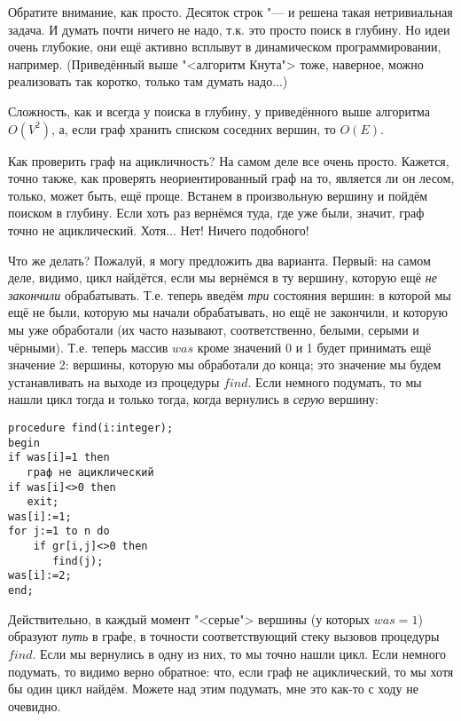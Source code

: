 Обратите внимание, как просто. Десяток строк "--- и решена такая нетривиальная задача. 
И думать почти ничего не надо, т.к. это просто поиск в глубину. Но идеи очень глубокие, они ещё 
активно всплывут в динамическом программировании, например. (Приведённый выше "<алгоритм Кнута">
тоже, наверное, можно реализовать так коротко, только там думать надо...)

Сложность, как и всегда у поиска в глубину, у приведённого выше алгоритма $O(V^2)$, а, если граф 
хранить списком соседних вершин, то $O(E)$.

Как проверить граф на ацикличность? На самом деле все очень просто. Кажется, точно также, как проверять 
неориентированный граф на то, является ли он лесом, только, может быть, ещё проще. Встанем в 
произвольную вершину и пойдём поиском в глубину. Если хоть раз вернёмся туда, где уже были, значит, 
граф точно не ациклический. Хотя... Нет! Ничего подобного!


Что же делать? Пожалуй, я могу предложить два варианта. Первый: на самом деле, видимо, цикл 
найдётся, если мы вернёмся в ту вершину, которую ещё \textit{не закончили} обрабатывать. Т.е. теперь введём 
\textit{три} состояния вершин: в которой мы ещё не были, которую мы начали обрабатывать, но ещё не 
закончили, и которую мы уже обработали (их часто называют, соответственно, белыми, серыми и чёрными). 
Т.е. теперь массив $was$ кроме значений 0 и 1 будет принимать ещё значение 2: вершины, которую мы 
обработали до конца; это значение мы будем устанавливать на выходе из процедуры $find$. Если 
немного подумать, то мы нашли цикл тогда и только тогда, когда вернулись в \textit{серую} вершину:
\begin{codesample}\begin{verbatim}
procedure find(i:integer);
begin
if was[i]=1 then
   граф не ациклический
if was[i]<>0 then
   exit;
was[i]:=1;
for j:=1 to n do
    if gr[i,j]<>0 then
       find(j);
was[i]:=2;
end;
\end{verbatim}
\end{codesample}
Действительно, в каждый момент "<серые"> вершины (у которых $was=1$) образуют \textit{путь} в графе, в 
точности соответствующий стеку вызовов процедуры $find$. Если мы вернулись в одну из них, то мы 
точно нашли цикл. Если немного подумать, то видимо верно обратное: что, если граф не ациклический, 
то мы хотя бы один цикл найдём. Можете над этим подумать, мне это как-то с ходу не очевидно.

